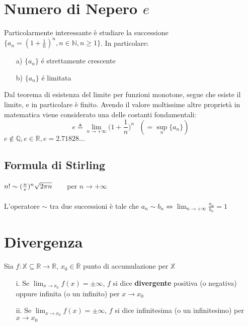 \section{Numero di Nepero $e$ }
Particolarmente interessante è studiare la successione $\{a_n=(1+ \frac{1}{n})^{n}, n \in \mathbb{N}, n \geq 1\}$. In particolare:
\begin{itemize}
\item[a)] $\{a_n\}$ \'e strettamente crescente
\item[b)] $\{a_n\}$ \'e limitata
\end{itemize}
Dal teorema di esistenza del limite per funzioni monotone, segue che esiste il limite, e in particolare è finito. Avendo il valore moltissime altre proprietà in matematica viene considerato una delle costanti fondamentali:
\begin{equation}
e \triangleq \displaystyle\lim_{n \to +\infty} \biggl(1+\frac{1}{n}\biggl)^n \text{      } (=\displaystyle\sup_{n} \{a_n\})
\end{equation}
$e \not \in \mathbb{Q}, e \in \mathbb{R}, e=2.71828...$
\subsection{Formula di Stirling}
$n! \sim (\frac{n}{e})^{n}\sqrt{2\pi n} \hspace{.6cm}$ per $n \to +\infty$ \\
\\
L'operatore $\sim$ tra due successioni è tale che $a_n \sim b_n \iff \displaystyle\lim_{n \to +\infty} \frac{a_n}{b_n} = 1$

\section{Divergenza}
Sia $f:\mathbb{X} \subseteq \mathbb{R} \to \mathbb{R}$, $x_0 \in \overline{\mathbb{R}}$ punto di accumulazione per $\mathbb{X}$
\begin{enumerate}
\item[i.]Se $\displaystyle\lim_{x \to x_0} f(x)=\pm \infty$, $f$ si dice \textbf{divergente} positiva (o negativa) oppure infinita (o un infinito) per $x \to x_0$
\item[ii.]Se $\displaystyle\lim_{x \to x_0} f(x)=\pm \infty$, $f$ si dice infinitesima (o un infinitesimo) per $x \to x_0$
\end{enumerate}

